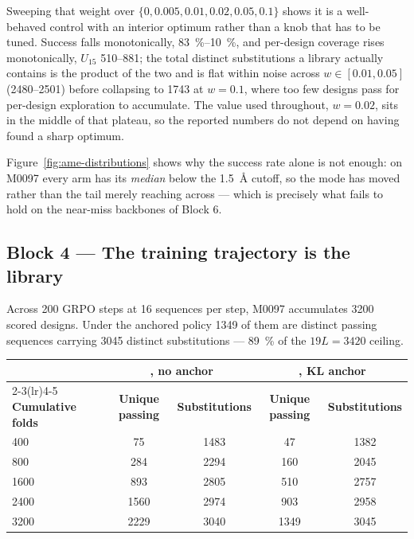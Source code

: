 Sweeping that weight over $\{0, 0.005, 0.01, 0.02, 0.05, 0.1\}$ shows it is a
well-behaved control with an interior optimum rather than a knob that has to be
tuned. Success falls monotonically, \SIrange{83}{10}{\percent}, and per-design
coverage rises monotonically, $U_{15}$ \numrange{510}{881}; the total distinct
substitutions a library actually contains is the product of the two and is flat
within noise across $w \in [0.01, 0.05]$ (\numrange{2480}{2501}) before
collapsing to \num{1743} at $w = 0.1$, where too few designs pass for
per-design exploration to accumulate. The value used throughout,
$w = \num{0.02}$, sits in the middle of that plateau, so the reported numbers do
not depend on having found a sharp optimum.

Figure~\ref{fig:ame-distributions} shows why the success rate alone is not
enough: on M0097 every \cleo{} arm has its \emph{median} below the
\SI{1.5}{\angstrom} cutoff, so the mode has moved rather than the tail merely
reaching across --- which is precisely what fails to hold on the near-miss
backbones of Block 6.

\subsection*{Block 4 --- The training trajectory is the library}


Across 200 GRPO steps at 16 sequences per step, M0097 accumulates 3200 scored
designs. Under the anchored policy \num{1349} of them are distinct passing
sequences carrying \num{3045} distinct substitutions --- \SI{89}{\percent} of the
$19L = 3420$ ceiling.

\begin{center}
\begin{tabular}{@{}lcccc@{}}
\toprule
& \multicolumn{2}{c}{\textbf{\cleo{}, no anchor}} &
  \multicolumn{2}{c}{\textbf{\cleo{}, KL anchor}} \\
\cmidrule(lr){2-3}\cmidrule(lr){4-5}
\textbf{Cumulative folds} & \textbf{Unique passing} & \textbf{Substitutions} &
\textbf{Unique passing} & \textbf{Substitutions} \\
\midrule
400  & 75   & 1483 & 47   & 1382 \\
800  & 284  & 2294 & 160  & 2045 \\
1600 & 893  & 2805 & 510  & 2757 \\
2400 & 1560 & 2974 & 903  & 2958 \\
3200 & 2229 & 3040 & 1349 & 3045 \\
\bottomrule
\end{tabular}
\end{center}

